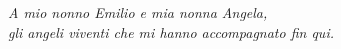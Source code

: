 \thispagestyle{empty}
\begin{flushright}
\vspace*{3.0cm}
{\large \textit{A mio nonno Emilio e mia nonna Angela,}} \\ 
{\large \textit{gli angeli viventi che mi hanno accompagnato fin qui.}} \\ 
\end{flushright}
